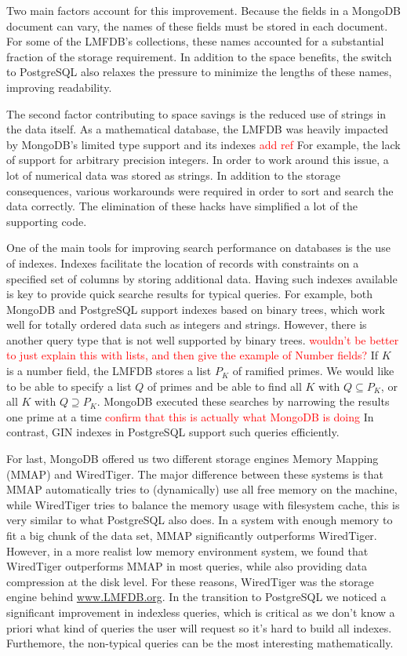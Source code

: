 \documentclass{article}
\newcommand{\todo}[1]{\textcolor{red}{#1}}
\begin{document}
Two main factors account for this improvement.
Because the fields in a MongoDB document can vary, the names of these fields must be stored in each document.
For some of the LMFDB's collections, these names accounted for a substantial fraction of the storage requirement.
In addition to the space benefits, the switch to PostgreSQL also relaxes the pressure to minimize the lengths of these names, improving readability.

The second factor contributing to space savings is the reduced use of strings in the data itself.
As a mathematical database, the LMFDB was heavily impacted by MongoDB's limited type support and its indexes \todo{add ref}
For example, the lack of support for arbitrary precision integers.
In order to work around this issue, a lot of numerical data was stored as strings.
In addition to the storage consequences, various workarounds were required in order to sort and search the data correctly.
The elimination of these hacks have simplified a lot of the supporting code.




One of the main tools for improving search performance on databases is the use of indexes.
Indexes facilitate the location of records with constraints on a specified set of columns by storing additional data.
Having such indexes available is key to provide quick searche results for typical queries.
For example, both MongoDB and PostgreSQL support indexes based on binary trees, which work well for totally ordered data such as integers and strings.
However, there is another query type that is not well supported by binary trees.
\todo{wouldn't be better to just explain this with lists, and then give the example of Number fields?}
If $K$ is a number field, the LMFDB stores a list $P_K$ of ramified primes.
We would like to be able to specify a list $Q$ of primes and be able to find all $K$ with $Q \subseteq P_K$, or all $K$ with $Q \supseteq P_K$.
MongoDB executed these searches by narrowing the results one prime at a time \todo{confirm that this is actually what MongoDB is doing}
In contrast, GIN indexes in PostgreSQL support such queries efficiently.






For last, MongoDB offered us two different storage engines Memory Mapping (MMAP) and WiredTiger.
The major difference between these systems is that MMAP automatically tries to (dynamically) use all free memory on the machine, while WiredTiger tries to balance the memory usage with filesystem cache, this is very similar to what PostgreSQL also does.
In a system with enough memory to fit a big chunk of the data set, MMAP significantly outperforms WiredTiger.
However, in a more realist low memory environment system, we found that WiredTiger outperforms MMAP in most queries, while also providing data compression at the disk level.
For these reasons, WiredTiger was the storage engine behind \url{www.LMFDB.org}.
In the transition to PostgreSQL we noticed a significant improvement in indexless queries, which is critical as we don't know a priori what kind of queries the user will request so it's hard to build all indexes. Furthemore, the non-typical queries can be the most interesting mathematically.
\end{document}
